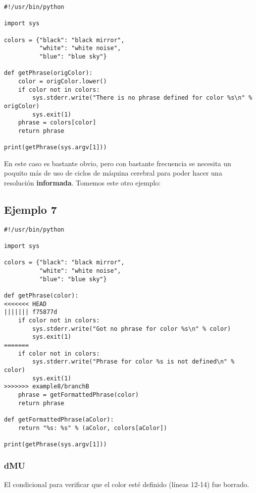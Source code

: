 \begin{lstlisting}[style=python_style,
	basicstyle=\small,
	caption={\bf Ejemplo 6} - resolución]
#!/usr/bin/python

import sys

colors = {"black": "black mirror",
          "white": "white noise",
          "blue": "blue sky"}

def getPhrase(origColor):
    color = origColor.lower()
    if color not in colors:
        sys.stderr.write("There is no phrase defined for color %s\n" % origColor)
        sys.exit(1)
    phrase = colors[color]
    return phrase

print(getPhrase(sys.argv[1]))
\end{lstlisting}

En este caso es bastante obvio, pero con bastante frecuencia se necesita un poquito más de uso de ciclos de máquina
cerebral para poder hacer una resolución {\bf informada}. Tomemos este otro ejemplo:

\subsection{Ejemplo 7}
\label{example_07}

\begin{lstlisting}[style=python_style,
	basicstyle=\small,
	caption={\bf Ejemplo 7}]
#!/usr/bin/python

import sys

colors = {"black": "black mirror",
          "white": "white noise",
          "blue": "blue sky"}

def getPhrase(color):
<<<<<<< HEAD
||||||| f75877d
    if color not in colors:
        sys.stderr.write("Got no phrase for color %s\n" % color)
        sys.exit(1)
=======
    if color not in colors:
        sys.stderr.write("Phrase for color %s is not defined\n" % color)
        sys.exit(1)
>>>>>>> example8/branchB
    phrase = getFormattedPhrase(color)
    return phrase

def getFormattedPhrase(aColor):
    return "%s: %s" % (aColor, colors[aColor])

print(getPhrase(sys.argv[1]))
\end{lstlisting}

\subsubsection{dMU}
El condicional para verificar que el color esté definido (líneas 12-14) fue borrado.

